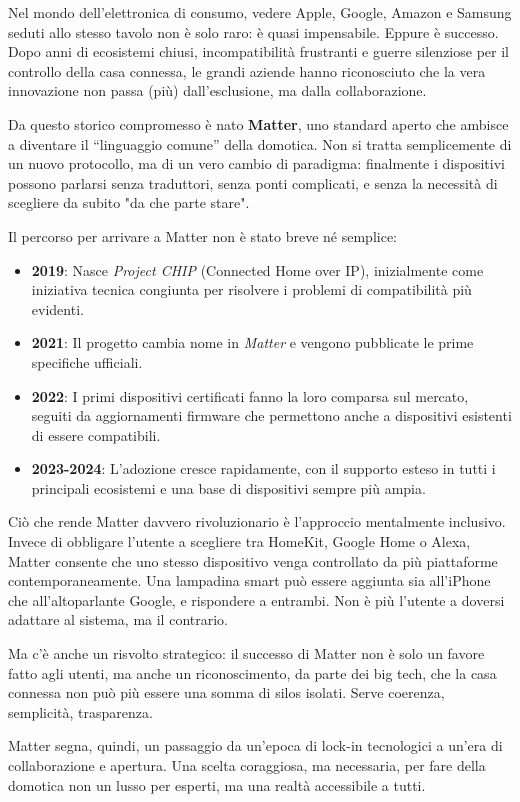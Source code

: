 Nel mondo dell’elettronica di consumo, vedere Apple, Google, Amazon e Samsung seduti allo stesso tavolo non è solo raro: è quasi impensabile. Eppure è successo. Dopo anni di ecosistemi chiusi, incompatibilità frustranti e guerre silenziose per il controllo della casa connessa, le grandi aziende hanno riconosciuto che la vera innovazione non passa (più) dall’esclusione, ma dalla collaborazione.

Da questo storico compromesso è nato \textbf{Matter}, uno standard aperto che ambisce a diventare il “linguaggio comune” della domotica. Non si tratta semplicemente di un nuovo protocollo, ma di un vero cambio di paradigma: finalmente i dispositivi possono parlarsi senza traduttori, senza ponti complicati, e senza la necessità di scegliere da subito "da che parte stare".

Il percorso per arrivare a Matter non è stato breve né semplice:

\begin{itemize}
    \item \textbf{2019}: Nasce \textit{Project CHIP} (Connected Home over IP), inizialmente come iniziativa tecnica congiunta per risolvere i problemi di compatibilità più evidenti.
    \item \textbf{2021}: Il progetto cambia nome in \textit{Matter} e vengono pubblicate le prime specifiche ufficiali.
    \item \textbf{2022}: I primi dispositivi certificati fanno la loro comparsa sul mercato, seguiti da aggiornamenti firmware che permettono anche a dispositivi esistenti di essere compatibili.
    \item \textbf{2023-2024}: L'adozione cresce rapidamente, con il supporto esteso in tutti i principali ecosistemi e una base di dispositivi sempre più ampia.
\end{itemize}

Ciò che rende Matter davvero rivoluzionario è l'approccio mentalmente inclusivo. Invece di obbligare l’utente a scegliere tra HomeKit, Google Home o Alexa, Matter consente che uno stesso dispositivo venga controllato da più piattaforme contemporaneamente. Una lampadina smart può essere aggiunta sia all’iPhone che all’altoparlante Google, e rispondere a entrambi. Non è più l’utente a doversi adattare al sistema, ma il contrario.

Ma c’è anche un risvolto strategico: il successo di Matter non è solo un favore fatto agli utenti, ma anche un riconoscimento, da parte dei big tech, che la casa connessa non può più essere una somma di silos isolati. Serve coerenza, semplicità, trasparenza.

Matter segna, quindi, un passaggio da un’epoca di lock-in tecnologici a un’era di collaborazione e apertura. Una scelta coraggiosa, ma necessaria, per fare della domotica non un lusso per esperti, ma una realtà accessibile a tutti.
